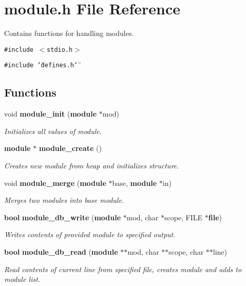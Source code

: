 \section{module.h File Reference}
\label{module_8h}
Contains functions for handling modules. 


{\tt \#include $<$stdio.h$>$}\par
{\tt \#include \char`\"{}defines.h\char`\"{}}\par
\subsection*{Functions}
\begin{CompactItemize}
\item 
void {\bf module\_\-init} ({\bf module} $\ast$mod)
\begin{CompactList}\small\item\em Initializes all values of module.\item\end{CompactList}\item 
{\bf module} $\ast$ {\bf module\_\-create} ()
\begin{CompactList}\small\item\em Creates new module from heap and initializes structure.\item\end{CompactList}\item 
void {\bf module\_\-merge} ({\bf module} $\ast$base, {\bf module} $\ast$in)
\begin{CompactList}\small\item\em Merges two modules into base module.\item\end{CompactList}\item 
{\bf bool} {\bf module\_\-db\_\-write} ({\bf module} $\ast$mod, char $\ast$scope, FILE $\ast${\bf file})
\begin{CompactList}\small\item\em Writes contents of provided module to specified output.\item\end{CompactList}\item 
{\bf bool} {\bf module\_\-db\_\-read} ({\bf module} $\ast$$\ast$mod, char $\ast$$\ast$scope, char $\ast$$\ast$line)
\begin{CompactList}\small\item\em Read contents of current line from specified file, creates module and adds to module list.\item\end{CompactList}\item 
$$
\end{CompactItemize}

